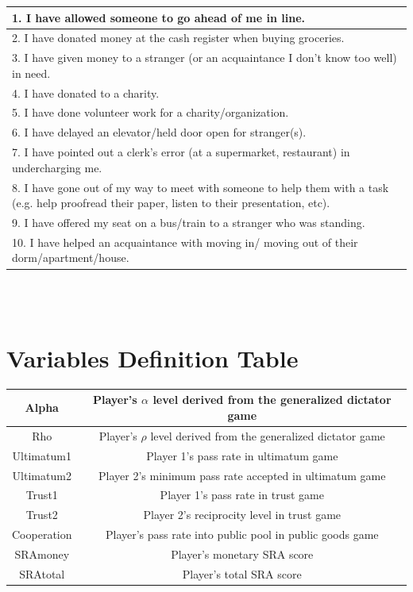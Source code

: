\documentclass[12pt]{article}
\begin{document}
\begin{tabular}{ | p{12cm} | }
\hline
1. I have allowed someone to go ahead of me in line.\\
\hline
2. I have donated money at the cash register when buying groceries.\\
\hline
3. I have given money to a stranger (or an acquaintance I don\rq t know too well) in need.\\ 
\hline
4. I have donated to a charity.\\
\hline
5. I have done volunteer work for a charity/organization.\\
\hline
6. I have delayed an elevator/held door open for stranger(s).\\
\hline
7.  I have pointed out a clerk\rq s error (at a supermarket, restaurant) in undercharging me.\\
\hline
8. I have gone out of my way to meet with someone to help them with a task (e.g. help proofread their paper, listen to their presentation, etc). \\
\hline
9. I have offered my seat on a bus/train to a stranger who was standing.\\
\hline
10. I have helped an acquaintance with moving in/ moving out of their dorm/apartment/house.\\
\hline
\end{tabular} \\ \\ 

\section{Variables Definition Table} \label{app:c}

\begin{center}
\begin{tabular}{ |c|c| } 
 \hline
 Alpha & Player\rq s \(\alpha\) level derived from the generalized dictator game \\ 
 \hline
  Rho & Player\rq s \(\rho\) level derived from the generalized dictator game \\ 
 \hline
 Ultimatum1 & Player 1\rq s pass rate in ultimatum game \\ 
 \hline
 Ultimatum2 & Player 2\rq s minimum pass rate accepted in ultimatum game  \\ 
 \hline
 Trust1 & Player 1\rq s pass rate in trust game \\ 
 \hline
 Trust2 & Player 2\rq s reciprocity level in trust game \\ 
 \hline
 Cooperation & Player\rq s pass rate into public pool in public goods game  \\ 
 \hline
 SRAmoney & Player\rq s monetary SRA score \\ 
 \hline
 SRAtotal & Player\rq s total SRA score \\ 
\hline
\end{tabular}
\end{center}
\end{document}
